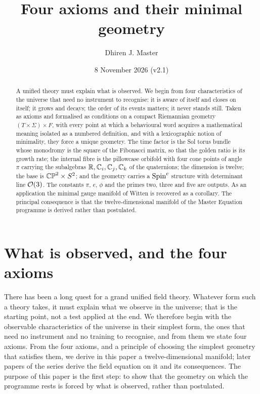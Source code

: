 \documentclass[11pt,a4paper]{article}
\title{Four axioms and their minimal geometry}
\author{Dhiren J. Master}
\date{8 November 2026 (v2.1)}
\theoremstyle{plain}
\theoremstyle{definition}
\theoremstyle{remark}
\begin{document}
\maketitle

\begin{abstract}
A unified theory must explain what is observed. We begin from four characteristics of the universe that need no instrument to recognise: it is aware of itself and closes on itself; it grows and decays; the order of its events matters; it never stands still. Taken as axioms and formalised as conditions on a compact Riemannian geometry $(T\times\Sigma)\times F$, with every point at which a behavioural word acquires a mathematical meaning isolated as a numbered definition, and with a lexicographic notion of minimality, they force a unique geometry. The time factor is the Sol torus bundle whose monodromy is the square of the Fibonacci matrix, so that the golden ratio is its growth rate; the internal fibre is the pillowcase orbifold with four cone points of angle $\pi$ carrying the subalgebras $\mathbb{R},\mathbb{C}_i,\mathbb{C}_j,\mathbb{C}_k$ of the quaternions; the dimension is twelve; the base is $\mathbb{CP}^2\times S^2$; and the geometry carries a $\text{Spin}^c$ structure with determinant line $\mathcal{O}(3)$. The constants $\pi$, $e$, $\phi$ and the primes two, three and five are outputs. As an application the minimal gauge manifold of Witten is recovered as a corollary. The principal consequence is that the twelve-dimensional manifold of the Master Equation programme is derived rather than postulated.
\end{abstract}

\section{What is observed, and the four axioms}\label{sec:intro}

There has been a long quest for a grand unified field theory. Whatever form such a theory takes, it must explain what we observe in the universe; that is the starting point, not a test applied at the end. We therefore begin with the observable characteristics of the universe in their simplest form, the ones that need no instrument and no training to recognise, and from them we state four axioms. From the four axioms, and a principle of choosing the simplest geometry that satisfies them, we derive in this paper a twelve-dimensional manifold; later papers of the series derive the field equation on it and its consequences. The purpose of this paper is the first step: to show that the geometry on which the programme rests is forced by what is observed, rather than postulated.
\end{document}
